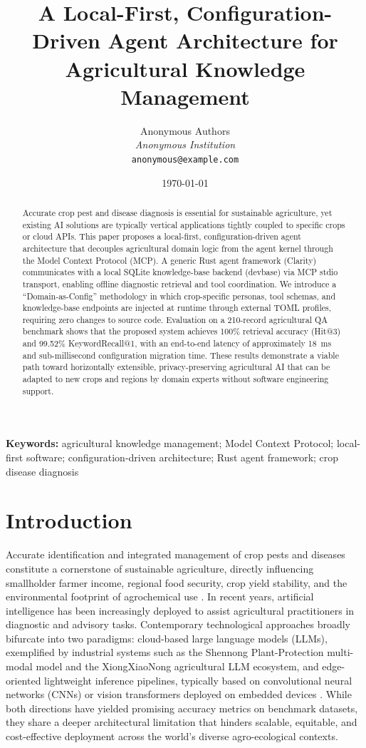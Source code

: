 \documentclass[11pt,a4paper]{article}
\title{A Local-First, Configuration-Driven Agent Architecture for Agricultural Knowledge Management}
\author{Anonymous Authors\\
        \textit{Anonymous Institution}\\
        \texttt{anonymous@example.com}}
\date{\today}
\begin{document}
\maketitle

\begin{abstract}
Accurate crop pest and disease diagnosis is essential for sustainable agriculture, yet existing AI solutions are typically vertical applications tightly coupled to specific crops or cloud APIs. This paper proposes a local-first, configuration-driven agent architecture that decouples agricultural domain logic from the agent kernel through the Model Context Protocol (MCP). A generic Rust agent framework (Clarity) communicates with a local SQLite knowledge-base backend (devbase) via MCP stdio transport, enabling offline diagnostic retrieval and tool coordination. We introduce a ``Domain-as-Config'' methodology in which crop-specific personas, tool schemas, and knowledge-base endpoints are injected at runtime through external TOML profiles, requiring zero changes to source code. Evaluation on a 210-record agricultural QA benchmark shows that the proposed system achieves 100\% retrieval accuracy (Hit@3) and 99.52\% KeywordRecall@1, with an end-to-end latency of approximately 18~ms and sub-millisecond configuration migration time. These results demonstrate a viable path toward horizontally extensible, privacy-preserving agricultural AI that can be adapted to new crops and regions by domain experts without software engineering support.
\end{abstract}

\textbf{Keywords:} agricultural knowledge management; Model Context Protocol; local-first software; configuration-driven architecture; Rust agent framework; crop disease diagnosis

\section{Introduction}

Accurate identification and integrated management of crop pests and diseases constitute a cornerstone of sustainable agriculture, directly influencing smallholder farmer income, regional food security, crop yield stability, and the environmental footprint of agrochemical use \cite{jearanaiwongkul2021riceman}. In recent years, artificial intelligence has been increasingly deployed to assist agricultural practitioners in diagnostic and advisory tasks. Contemporary technological approaches broadly bifurcate into two paradigms: cloud-based large language models (LLMs), exemplified by industrial systems such as the Shennong Plant-Protection multi-modal model \cite{wang2024shennong} and the XiongXiaoNong agricultural LLM ecosystem, and edge-oriented lightweight inference pipelines, typically based on convolutional neural networks (CNNs) or vision transformers deployed on embedded devices \cite{chatdemeter2025}. While both directions have yielded promising accuracy metrics on benchmark datasets, they share a deeper architectural limitation that hinders scalable, equitable, and cost-effective deployment across the world's diverse agro-ecological contexts.
\end{document}
